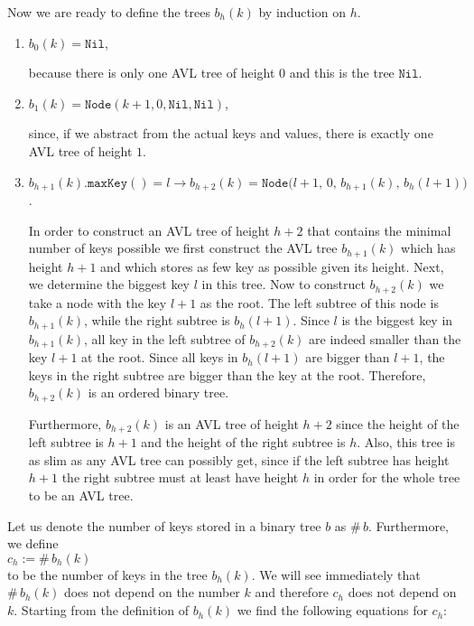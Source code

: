 Now we are ready to define the trees  $b_h(k)$ by induction on  $h$.
\begin{enumerate}
\item $b_0(k) = \texttt{Nil}$,

      because there is only one AVL tree of height $0$ and this is the tree $\texttt{Nil}$.
\item $b_1(k) = \texttt{Node}(k+1,0,\texttt{Nil}, \texttt{Nil})$,

      since, if we abstract from the actual keys and values, there is exactly one AVL tree of height
      $1$.
\item $b_{h+1}(k).\texttt{maxKey}() = l \rightarrow 
       b_{h+2}(k) = \texttt{Node}\bigl(l+1,\,0,\,b_{h+1}(k),\,b_h(l+1)\bigr)$.

      In order to construct an AVL tree of height $h+2$ that contains the minimal number of keys 
      possible we first construct the AVL tree $b_{h+1}(k)$ which has height  $h+1$ and which stores as few
      key as possible given its height.  Next, we determine the biggest key $l$ in this tree. 
      Now to construct $b_{h+2}(k)$ we take a node with the key $l+1$ as the root.
      The left subtree of this node is $b_{h+1}(k)$, while the right subtree is $b_h(l+1)$.
      Since $l$ is the biggest key in $b_{h+1}(k)$, all key in the left subtree of
      $b_{h+2}(k)$ are indeed smaller than the key $l+1$ at the root.  Since all keys in
      $b_h(l+1)$ are bigger than $l+1$, the keys in the right subtree are bigger than the key at the
      root.  Therefore, $b_{h+2}(k)$ is an ordered binary tree.

      Furthermore, $b_{h+2}(k)$ is an AVL tree of height $h+2$ since the height of the left subtree
      is $h+1$ and the height of the right subtree is $h$.  Also, this tree is as slim as
      any AVL tree can possibly get, since if the left subtree has height $h+1$ the right subtree
      must at least have height $h$ in order for the whole tree to be an AVL tree.
\end{enumerate}
Let us denote the number of keys stored in a binary tree $b$ as  $\#\,b$.  Furthermore, we define
\\[0.2cm]
\hspace*{1.3cm}
$c_h := \#\, b_h(k)$
\\[0.2cm]
to be the number of keys in the tree $b_h(k)$.  We will see immediately that 
$\#\,b_h(k)$ does not depend on the number $k$ and therefore $c_h$ does not depend on $k$.  Starting
from the definition of $b_h(k)$ we find the following equations for $c_h$:
